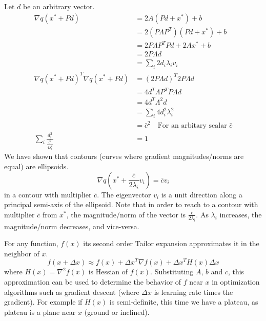\documentclass{article}
\numberwithin{equation}{subsection}
\begin{document}
Let $d$ be an arbitrary vector.
\begin{align}
    \nabla q(x^* + Pd) &= 2A(Pd + x^*)+b\\
    &= 2(P\Lambda P^T)(Pd + x^*)+b\\
    &= 2P\Lambda P^TPd + 2Ax^*+b\\
    &= 2P\Lambda d\\
    &= \sum_i 2d_i\lambda_i v_i\\
    \nabla q(x^*+Pd)^T \nabla q(x^*+Pd) &= (2P\Lambda d)^T2P\Lambda d\\
    &= 4d^T\Lambda P^TP\Lambda d\\
    &= 4d^T\Lambda^2 d\\
    &= \sum_i 4d_i^2  \lambda_i^2\\
    &= \bar{c}^2 \quad \text{For an arbitary scalar $\bar{c}$}\\
    \sum_i \frac{d_i^2}{\frac{\bar{c}^2}{4\lambda_i^2}} &= 1
\end{align}
We have shown that contours (curves where gradient magnitudes/norms are equal) are ellipsoids.
\begin{equation}
    \nabla q(x^* + \frac{\bar{c}}{2\lambda_i}v_i) = \bar{c}v_i
\end{equation}
in a contour with multiplier $\bar{c}$. The eigenvector $v_i$ is a unit direction along a principal semi-axis of the ellipsoid. Note that in order to reach to a contour with multiplier $\bar{c}$ from $x^*$, the magnitude/norm of the vector is $\frac{\bar{c}}{2\lambda_i}$. As $\lambda_i$ increases, the magnitude/norm decreases, and vice-versa.

For any function, $f(x)$ its second order Tailor expansion approximates it in the neighbor of $x$.
\begin{equation}
    f(x+\Delta x) \approx f(x)+\Delta x^T\nabla f(x)+\Delta x^TH(x)\Delta x
\end{equation}
where $H(x) = \nabla^2f(x)$ is Hessian of $f(x)$. Substituting $A$, $b$ and $c$, this approximation can be used to determine the behavior of $f$ near $x$ in optimization algorithms such as gradient descent (where $\Delta x$ is learning rate times the gradient). For example if $H(x)$ is semi-definite, this time we have a plateau, as plateau is a plane near $x$ (ground or inclined).
\end{document}
